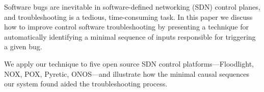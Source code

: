 Software bugs are inevitable in software-defined networking (SDN) control planes,
and troubleshooting
is a tedious, time-consuming task. In this paper we discuss how to improve
control software troubleshooting by presenting a technique
for automatically identifying
a minimal sequence of inputs responsible for triggering a given bug.

We apply our technique to five open source SDN control
platforms---Floodlight, NOX, POX, Pyretic, ONOS---and
illustrate how the minimal causal sequences our system found aided the
troubleshooting process.
